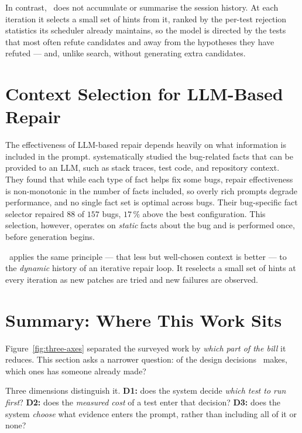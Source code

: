 In contrast, \caster\ does not accumulate or summarise the session history. At
each iteration it selects a small set of hints from it, ranked by the per-test
rejection statistics its scheduler already maintains, so the model is directed
by the tests that most often refute candidates and away from the hypotheses
they have refuted --- and, unlike search, without generating extra candidates.

\section{Context Selection for LLM-Based Repair}
\label{sec:rel-context}

The effectiveness of LLM-based repair depends heavily on what information is
included in the prompt. \citet{parasaram2025factselection} systematically
studied the bug-related facts that can be provided to an LLM, such as stack
traces, test code, and repository context. They found that while each type of
fact helps fix some bugs, repair effectiveness is non-monotonic in the number of
facts included, so overly rich prompts degrade performance, and no single fact
set is optimal across bugs. Their bug-specific fact selector repaired $88$ of
$157$ bugs, $17\,\%$ above the best configuration. This selection,
however, operates on \emph{static} facts about the bug and is performed once,
before generation begins.

\caster\ applies the same principle --- that less but well-chosen context is
better --- to the \emph{dynamic} history of an iterative repair loop. It
reselects a small set of hints at every iteration as new patches are tried and
new failures are observed.

\section{Summary: Where This Work Sits}
\label{sec:rel-summary}

Figure~\ref{fig:three-axes} separated the surveyed work by \emph{which part
of the bill} it reduces. This section asks a narrower question: of the
design decisions \caster\ makes, which ones has someone already made?

Three dimensions distinguish it. \textbf{D1:} does the system decide
\emph{which test to run first}? \textbf{D2:} does the \emph{measured cost} of
a test enter that decision? \textbf{D3:} does the system \emph{choose} what
evidence enters the prompt, rather than including all of it or none?

